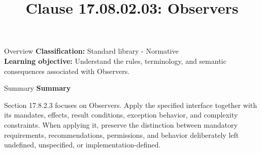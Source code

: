 \documentclass[10pt,letterpaper]{article}
\title{Clause 17.08.02.03: Observers}
\author{}
\date{}
\begin{document}
\maketitle
\begin{CornellOverviewBox}{Overview}
\textbf{Classification:} Standard library - Normative\\[2pt]
\textbf{Learning objective:} Understand the rules, terminology, and semantic consequences associated with Observers.
\end{CornellOverviewBox}\begin{CornellSummaryBox}{Summary}
{\sffamily\bfseries\color{Accent} Summary}\par\vspace{3pt}Section 17.8.2.3 focuses on Observers. Apply the specified interface together with its mandates, effects, result conditions, exception behavior, and complexity constraints. When applying it, preserve the distinction between mandatory requirements, recommendations, permissions, and behavior deliberately left undefined, unspecified, or implementation-defined.
\end{CornellSummaryBox}
\end{document}
